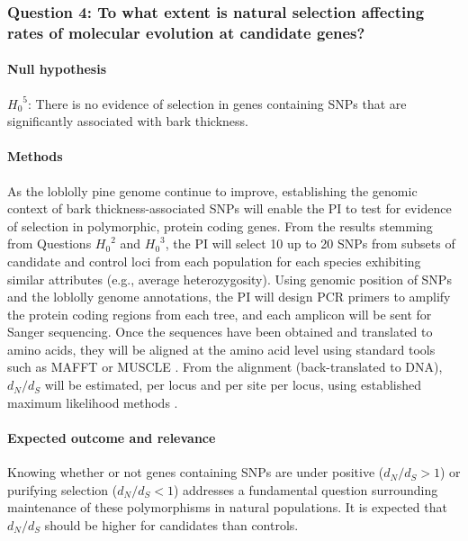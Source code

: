 \subsubsection*{Question 4: To what extent is natural selection affecting rates of molecular evolution at candidate genes?}

\paragraph{Null hypothesis} ${H_0}^5$: There is no evidence of selection in genes containing SNPs that are significantly associated 
with bark thickness.

\paragraph{Methods} As the loblolly pine genome continue to improve, establishing the genomic context of 
bark thickness-associated SNPs will enable the PI to test for evidence of selection in polymorphic, protein coding genes.  
From the results stemming from Questions ${H_0}^2$ and ${H_0}^3$, the PI will select 10 up to 20 SNPs from subsets of 
candidate and control loci from each population for each species exhibiting similar attributes (e.g., average heterozygosity).   
Using genomic position of SNPs and the loblolly genome annotations, the PI will design PCR primers to amplify the protein 
coding regions from each tree, and each amplicon will be sent for Sanger sequencing.  Once the sequences have been 
obtained and translated to amino acids, they will be aligned at the amino acid level using standard tools such as MAFFT 
\citep{Katoh:2005ia} or MUSCLE \citep{Edgar:2004ic}.  From the alignment (back-translated to DNA), $d_N/d_S$ will be 
estimated, per locus and per site per locus, using established maximum likelihood methods \citep{Yang:2007ki}.

\paragraph{Expected outcome and relevance}  Knowing whether or not genes containing SNPs are under positive ($d_N/d_S > 1$) or 
purifying selection ($d_N/d_S < 1$) addresses a fundamental question surrounding maintenance of these polymorphisms in 
natural populations.  It is expected that $d_N/d_S$ should be higher for candidates than controls.

